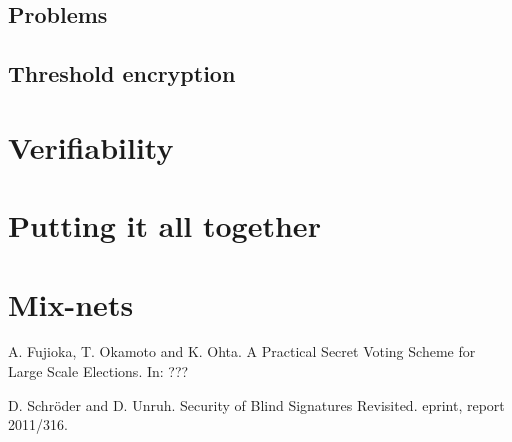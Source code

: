 \documentclass{llncs}
\begin{document}
\subsection{Problems}

\subsection{Threshold encryption}

\section{Verifiability}

\section{Putting it all together}

\section{Mix-nets}

\begin{thebibliography}{XXX11}
A. Fujioka, T. Okamoto and K. Ohta.
A Practical Secret Voting Scheme for Large Scale Elections.
In: ???

D. Schr\"oder and D. Unruh.
Security of Blind Signatures Revisited.
eprint, report 2011/316.

\end{thebibliography}
\end{document}
